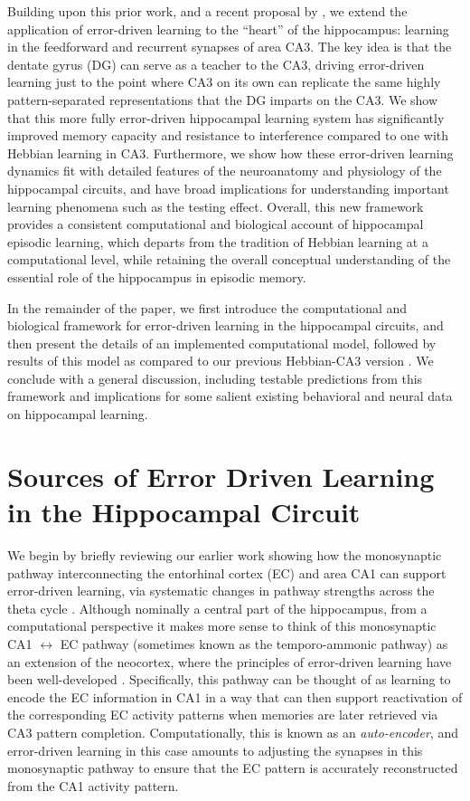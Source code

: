 \documentclass[11pt,twoside]{article}
\newif\myifpdf
\begin{document}
Building upon this prior work, and a recent proposal by \citet{KowadloAhmedRawlinson20}, we extend the application of error-driven learning to the ``heart'' of the hippocampus: learning in the feedforward and recurrent synapses of area CA3.  The key idea is that the dentate gyrus (DG) can serve as a teacher to the CA3, driving error-driven learning just to the point where CA3 on its own can replicate the same highly pattern-separated representations that the DG imparts on the CA3.  We show that this more fully error-driven hippocampal learning system has significantly improved memory capacity and resistance to interference compared to one with Hebbian learning in CA3.  Furthermore, we show how these error-driven learning dynamics fit with detailed features of the neuroanatomy and physiology of the hippocampal circuits, and have broad implications for understanding important learning phenomena such as the testing effect.  Overall, this new framework provides a consistent computational and biological account of hippocampal episodic learning, which departs from the tradition of Hebbian learning at a computational level, while retaining the overall conceptual understanding of the essential role of the hippocampus in episodic memory.

In the remainder of the paper, we first introduce the computational and biological framework for error-driven learning in the hippocampal circuits, and then present the details of an implemented computational model, followed by results of this model as compared to our previous Hebbian-CA3 version \citep{KetzMorkondaOReilly13}.  We conclude with a general discussion, including testable predictions from this framework and implications for some salient existing behavioral and neural data on hippocampal learning.

\section{Sources of Error Driven Learning in the Hippocampal Circuit}

We begin by briefly reviewing our earlier work showing how the monosynaptic pathway interconnecting the entorhinal cortex (EC) and area CA1 can support error-driven learning, via systematic changes in pathway strengths across the theta cycle \citep{KetzMorkondaOReilly13,HasselmoBodelonWyble02}.  Although nominally a central part of the hippocampus, from a computational perspective it makes more sense to think of this monosynaptic CA1 $\leftrightarrow$ EC pathway (sometimes known as the temporo-ammonic pathway) as an extension of the neocortex, where the principles of error-driven learning have been well-developed \citep{OReilly96,WhittingtonBogacz19}.  Specifically, this pathway can be thought of as learning to encode the EC information in CA1 in a way that can then support reactivation of the corresponding EC activity patterns when memories are later retrieved via CA3 pattern completion.  Computationally, this is known as an \emph{auto-encoder}, and error-driven learning in this case amounts to adjusting the synapses in this monosynaptic pathway to ensure that the EC pattern is accurately reconstructed from the CA1 activity pattern.
\end{document}
